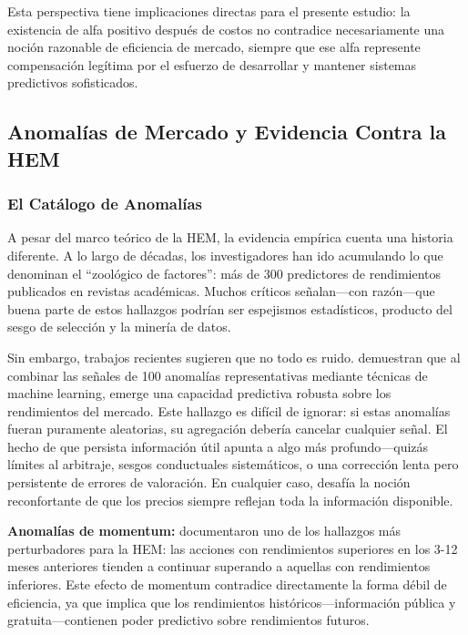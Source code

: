\documentclass[11pt,a4paper]{article}
\begin{document}
Esta perspectiva tiene implicaciones directas para el presente estudio: la existencia de alfa positivo después de costos no contradice necesariamente una noción razonable de eficiencia de mercado, siempre que ese alfa represente compensación legítima por el esfuerzo de desarrollar y mantener sistemas predictivos sofisticados.

\subsection{Anomalías de Mercado y Evidencia Contra la HEM}

\subsubsection{El Catálogo de Anomalías}

A pesar del marco teórico de la HEM, la evidencia empírica cuenta una historia diferente. A lo largo de décadas, los investigadores han ido acumulando lo que \citet{harvey2016} denominan el ``zool\'ogico de factores'': más de 300 predictores de rendimientos publicados en revistas académicas. Muchos críticos señalan---con razón---que buena parte de estos hallazgos podrían ser espejismos estadísticos, producto del sesgo de selección y la minería de datos.

Sin embargo, trabajos recientes sugieren que no todo es ruido. \citet{dong2022} demuestran que al combinar las señales de 100 anomalías representativas mediante técnicas de machine learning, emerge una capacidad predictiva robusta sobre los rendimientos del mercado. Este hallazgo es difícil de ignorar: si estas anomalías fueran puramente aleatorias, su agregación debería cancelar cualquier señal. El hecho de que persista información útil apunta a algo más profundo---quizás límites al arbitraje, sesgos conductuales sistemáticos, o una corrección lenta pero persistente de errores de valoración. En cualquier caso, desafía la noción reconfortante de que los precios siempre reflejan toda la información disponible.

\textbf{Anomalías de momentum:} \citet{jegadeesh1993} documentaron uno de los hallazgos más perturbadores para la HEM: las acciones con rendimientos superiores en los 3-12 meses anteriores tienden a continuar superando a aquellas con rendimientos inferiores. Este efecto de momentum contradice directamente la forma débil de eficiencia, ya que implica que los rendimientos históricos---información pública y gratuita---contienen poder predictivo sobre rendimientos futuros.
\end{document}

